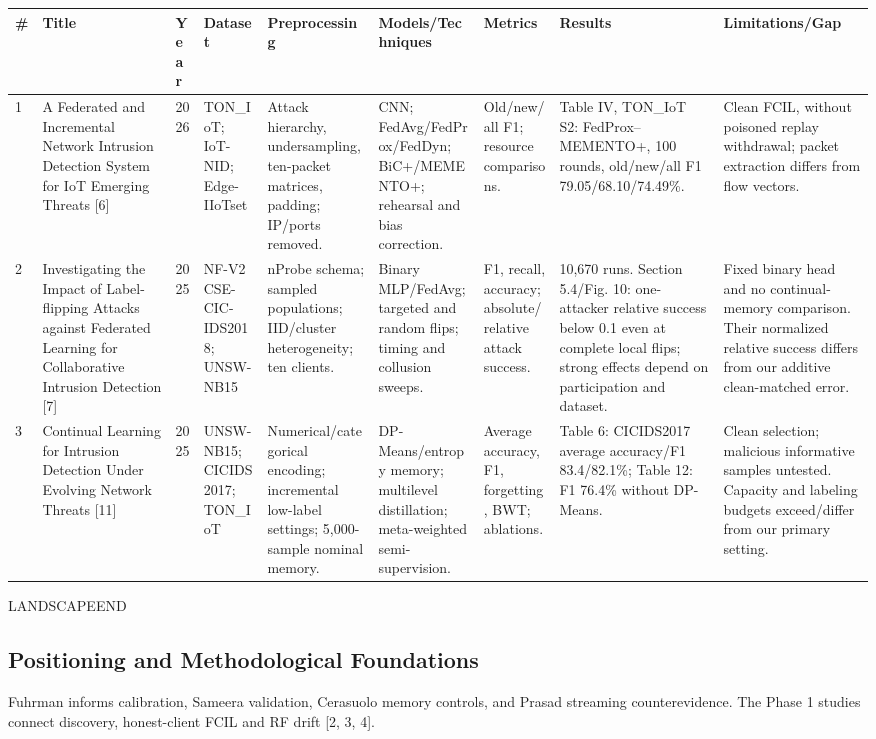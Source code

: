 \documentclass[10pt,a4paper]{article}
\begin{document}
\begin{longtable}{p{0.35cm}p{3.0cm}p{0.7cm}l l l l l l}
\toprule
\# & Title & Year & Dataset & Preprocessing & Models/Techniques & Metrics & Results & Limitations/Gap\\
\midrule
1 & A Federated and Incremental Network Intrusion Detection System for IoT Emerging Threats [6]
& 2026 & TON\_IoT; IoT-NID; Edge-IIoTset
& Attack hierarchy, undersampling, ten-packet matrices, padding; IP/ports removed.
& CNN; FedAvg/FedProx/FedDyn; BiC+/MEMENTO+; rehearsal and bias correction.
& Old/new/all F1; resource comparisons.
& Table IV, TON\_IoT S2: FedProx--MEMENTO+, 100 rounds, old/new/all F1 79.05/68.10/74.49\%.
& Clean FCIL, without poisoned replay withdrawal; packet extraction differs from flow vectors.\\[4pt]
2 & Investigating the Impact of Label-flipping Attacks against Federated Learning for Collaborative Intrusion Detection [7]
& 2025 & NF-V2 CSE-CIC-IDS2018; UNSW-NB15
& nProbe schema; sampled populations; IID/cluster heterogeneity; ten clients.
& Binary MLP/FedAvg; targeted and random flips; timing and collusion sweeps.
& F1, recall, accuracy; absolute/relative attack success.
& 10,670 runs. Section 5.4/Fig. 10: one-attacker relative success below 0.1 even at complete local flips; strong effects depend on participation and dataset.
& Fixed binary head and no continual-memory comparison. Their normalized relative success differs from our additive clean-matched error.\\[4pt]
3 & Continual Learning for Intrusion Detection Under Evolving Network Threats [11]
& 2025 & UNSW-NB15; CICIDS2017; TON\_IoT
& Numerical/categorical encoding; incremental low-label settings; 5,000-sample nominal memory.
& DP-Means/entropy memory; multilevel distillation; meta-weighted semi-supervision.
& Average accuracy, F1, forgetting, BWT; ablations.
& Table 6: CICIDS2017 average accuracy/F1 83.4/82.1\%; Table 12: F1 76.4\% without DP-Means.
& Clean selection; malicious informative samples untested. Capacity and labeling budgets exceed/differ from our primary setting.\\
\bottomrule
\end{longtable}


\par LANDSCAPEEND



\subsection{Positioning and Methodological Foundations}
Fuhrman informs calibration, Sameera validation, Cerasuolo memory controls, and Prasad streaming counterevidence. The Phase 1 studies connect discovery, honest-client FCIL and RF drift [2, 3, 4].
\end{document}
